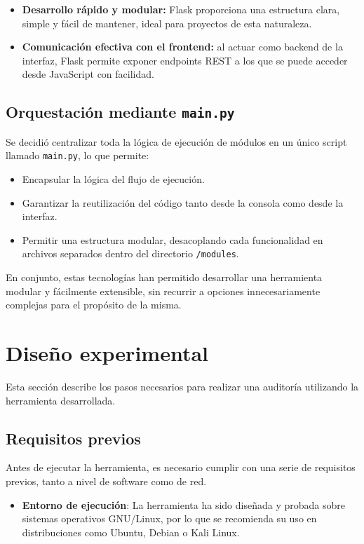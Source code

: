 \begin{parskipenv}
\begin{itemize}
    \item \textbf{Desarrollo rápido y modular:} Flask proporciona una estructura clara, simple y fácil de mantener, ideal para proyectos de esta naturaleza.
    
    \item \textbf{Comunicación efectiva con el frontend:} al actuar como backend de la interfaz, Flask permite exponer endpoints REST a los que se puede acceder desde JavaScript con facilidad.
\end{itemize}

\subsection{Orquestación mediante \texttt{main.py}}
Se decidió centralizar toda la lógica de ejecución de módulos en un único script llamado \texttt{main.py}, lo que permite:

\begin{itemize}
    \item Encapsular la lógica del flujo de ejecución.
    \item Garantizar la reutilización del código tanto desde la consola como desde la interfaz.
    \item Permitir una estructura modular, desacoplando cada funcionalidad en archivos separados dentro del directorio \texttt{/modules}.
\end{itemize}

En conjunto, estas tecnologías han permitido desarrollar una herramienta modular y fácilmente extensible, sin recurrir a opciones innecesariamente complejas para el propósito de la misma.

\section{Diseño experimental}
Esta sección describe los pasos necesarios para realizar una auditoría utilizando la herramienta desarrollada.

\subsection{Requisitos previos}
Antes de ejecutar la herramienta, es necesario cumplir con una serie de requisitos previos, tanto a nivel de software como de red.

\begin{itemize}
  \item \textbf{Entorno de ejecución}: La herramienta ha sido diseñada y probada sobre sistemas operativos GNU/Linux, por lo que se recomienda su uso en distribuciones como Ubuntu, Debian o Kali Linux.


\end{itemize}
\end{parskipenv}
